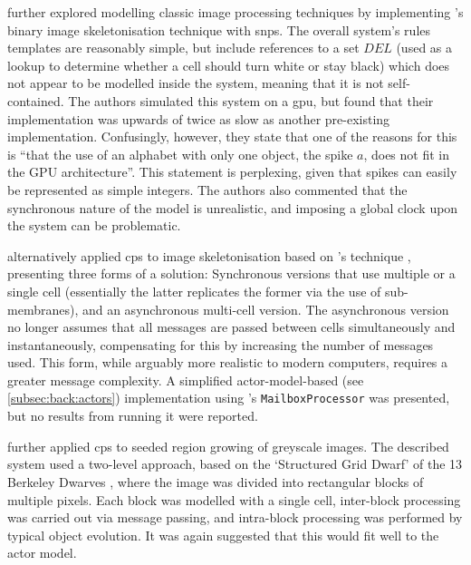 \citeauthor{Diaz-Pernil2013a} \cite{Diaz-Pernil2013a} further explored modelling classic image processing techniques by implementing \citeauthor{Guo1989}'s binary image skeletonisation technique \cite{Guo1989} with \gls{snps}.  The overall system's rules templates are reasonably simple, but include references to a set \(\mathit{DEL}\) (used as a lookup to determine whether a cell should turn white or stay black) which does not appear to be modelled inside the system, meaning that it is not self-contained.  The authors simulated this system on a \gls{gpu}, but found that their implementation was upwards of twice as slow as another pre-existing implementation.  Confusingly, however, they state that one of the reasons for this is \enquote{that the use of an alphabet with only one object, the spike \(a\), does not fit in the GPU architecture}.  This statement is perplexing, given that spikes can easily be represented as simple integers.  The authors also commented that the synchronous nature of the model is unrealistic, and imposing a global clock upon the system can be problematic.

\citeauthor{Nicolescu2014} \cite{Nicolescu2014} alternatively applied \gls{cps} to image skeletonisation based on \citeauthor{Guo1989}'s technique \cite{Guo1989}, presenting three forms of a solution: Synchronous versions that use multiple or a single cell (essentially the latter replicates the former via the use of sub-membranes), and an asynchronous multi-cell version.  The asynchronous version no longer assumes that all messages are passed between cells simultaneously and instantaneously, compensating for this by increasing the number of messages used.  This form, while arguably more realistic to modern computers, requires a greater message complexity. A simplified \Gls{actor}-model-based (see \cref{subsec:back:actors}) implementation using \fsharp{}'s \texttt{MailboxProcessor} \cite[ch.~11]{Syme2015a} was presented, but no results from running it were reported.

\citeauthor{Nicolescu2015} \cite{Nicolescu2015} further applied \gls{cps} to seeded region growing of greyscale images.  The described system used a two-level approach, based on the `Structured Grid Dwarf' of the 13 Berkeley Dwarves \cite{Asanovic2006}, where the image was divided into rectangular blocks of multiple pixels.  Each block was modelled with a single cell, inter-block processing was carried out via message passing, and intra-block processing was performed by typical object evolution.  It was again suggested that this would fit well to the \Gls{actor} model.

